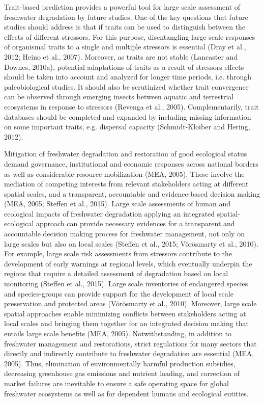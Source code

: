 Trait-based prediction provides a powerful tool for large scale assessment of freshwater degradation by future studies. One of the key questions that future studies should address is that if traits can be used to distinguish between the effects of different stressors. For this purpose, disentangling large scale responses of organismal traits to a single and multiple stressors is essential (Dray et al., 2012; Heino et al., 2007). Moreover, as traits are not stable (Lancaster and Downes, 2010a), potential adaptations of traits as a result of stressors effects should be taken into account and analyzed for longer time periods, i.e. through paleobiological studies. It should also be scrutinized whether trait convergence can be observed through emerging insects between aquatic and terrestrial ecosystems in response to stressors (Revenga et al., 2005). Complementarily, trait databases should be completed and expanded by including missing information on some important traits, e.g. dispersal capacity (Schmidt-Kloiber and Hering, 2012).

Mitigation of freshwater degradation and restoration of good ecological status demand governance, institutional and economic responses across national borders as well as considerable resource mobilization (MEA, 2005). These involve the mediation of competing interests from relevant stakeholders acting at different spatial scales, and a transparent, accountable and evidence-based decision making (MEA, 2005; Steffen et al., 2015). Large scale assessments of human and ecological impacts of freshwater degradation applying an integrated spatial-ecological approach can provide necessary evidences for a transparent and accountable decision making process for freshwater management, not only on large scales but also on local scales (Steffen et al., 2015; Vörösmarty et al., 2010). For example, large scale risk assessments from stressors contribute to the development of early warnings at regional levels, which eventually underpin the regions that require a detailed assessment of degradation based on local monitoring (Steffen et al., 2015). Large scale inventories of endangered species and species-groups can provide support for the development of local scale preservation and protected areas (Vörösmarty et al., 2010). Moreover, large scale spatial approaches enable minimizing conflicts between stakeholders acting at local scales and bringing them together for an integrated decision making that entails large scale benefits (MEA, 2005). Notwithstanding, in addition to freshwater management and restorations, strict regulations for many sectors that directly and indirectly contribute to freshwater degradation are essential (MEA, 2005). Thus, elimination of environmentally harmful production subsidies, decreasing greenhouse gas emissions and nutrient loading, and correction of market failures are inevitable to ensure a safe operating space for global freshwater ecosystems as well as for dependent humans and ecological entities.

